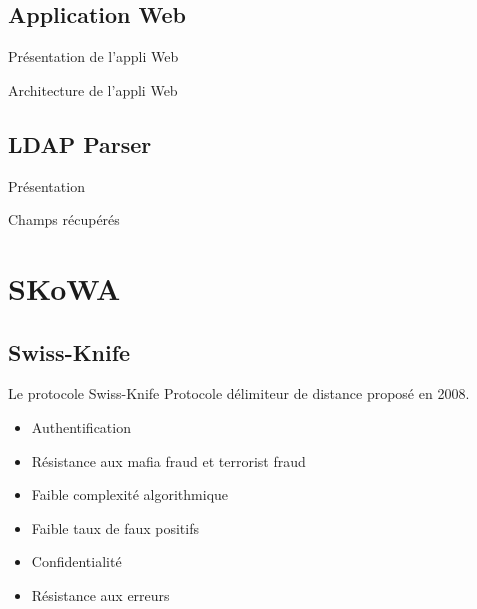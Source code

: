 \documentclass[aspectratio=169]{beamer}
\begin{document}
\subsection{Application Web}

\begin{frame}{Présentation de l'appli Web}  

\end{frame}

\begin{frame}{Architecture de l'appli Web}  

\end{frame}



\subsection{LDAP Parser}

\begin{frame}{Présentation}  

\end{frame}

\begin{frame}{Champs récupérés}  

\end{frame}

\section{SKoWA}

\subsection{Swiss-Knife}

\begin{frame}{Le protocole Swiss-Knife}
  Protocole délimiteur de distance proposé en 2008. \cite{SwissKnife}

  \bigskip

  \begin{itemize}
    \item Authentification
    \item Résistance aux mafia fraud et terrorist fraud
    \item Faible complexité algorithmique
    \item Faible taux de faux positifs
    \item Confidentialité
    \item Résistance aux erreurs
  \end{itemize}
\end{frame}
\end{document}
